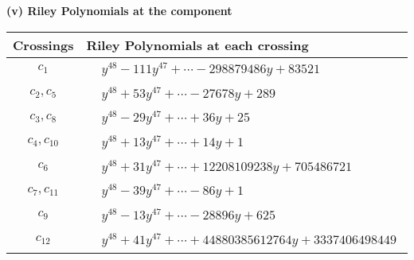 \documentclass[1p]{elsarticle_modified}
\theoremstyle{definition}
\begin{document}
\newpage\renewcommand{\arraystretch}{1}
\flushleft \textbf{(v) Riley Polynomials at the component}\newline \\
\begin{tabular}{m{50pt}|m{274pt}}
Crossings & \hspace{64pt}Riley Polynomials at each crossing \\
\hline $$\begin{aligned}c_{1}\end{aligned}$$&$\begin{aligned}
&y^{48}-111 y^{47}+\cdots-298879486 y+83521
\end{aligned}$\\
\hline $$\begin{aligned}c_{2},c_{5}\end{aligned}$$&$\begin{aligned}
&y^{48}+53 y^{47}+\cdots-27678 y+289
\end{aligned}$\\
\hline $$\begin{aligned}c_{3},c_{8}\end{aligned}$$&$\begin{aligned}
&y^{48}-29 y^{47}+\cdots+36 y+25
\end{aligned}$\\
\hline $$\begin{aligned}c_{4},c_{10}\end{aligned}$$&$\begin{aligned}
&y^{48}+13 y^{47}+\cdots+14 y+1
\end{aligned}$\\
\hline $$\begin{aligned}c_{6}\end{aligned}$$&$\begin{aligned}
&y^{48}+31 y^{47}+\cdots+12208109238 y+705486721
\end{aligned}$\\
\hline $$\begin{aligned}c_{7},c_{11}\end{aligned}$$&$\begin{aligned}
&y^{48}-39 y^{47}+\cdots-86 y+1
\end{aligned}$\\
\hline $$\begin{aligned}c_{9}\end{aligned}$$&$\begin{aligned}
&y^{48}-13 y^{47}+\cdots-28896 y+625
\end{aligned}$\\
\hline $$\begin{aligned}c_{12}\end{aligned}$$&$\begin{aligned}
&y^{48}+41 y^{47}+\cdots+44880385612764 y+3337406498449
\end{aligned}$\\
\hline
\end{tabular}\\~\\
\end{document}
